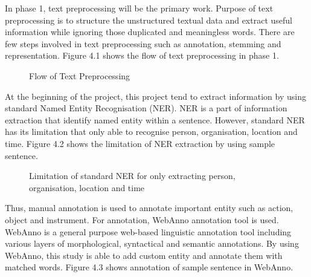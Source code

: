 \documentclass[twoside]{utmthesis}
\begin{document}
In phase 1, text preprocessing will be the primary work. Purpose of text preprocessing is to structure the unstructured textual data and extract useful information while ignoring those duplicated and meaningless words. There are few steps involved in text preprocessing such as annotation, stemming and representation. Figure 4.1 shows the flow of text preprocessing in phase 1.
\begin{figure}[H]
	\centering
	\caption{Flow of Text Preprocessing}
	\label{fig:phase1-steps}
\end{figure}
\vspace{-1cm}

At the beginning of the project, this project tend to extract information by using standard Named Entity Recognisation (NER). NER is a part of information extraction that identify named entity within a sentence.  However, standard NER has its limitation that only able to recognise person, organisation, location and time. Figure 4.2 shows the limitation of NER extraction by using sample sentence. 
\begin{figure}[H]
	\centering
	\caption{Limitation of standard NER for only extracting person, organisation, location and time}
	\label{fig:spacy4}
\end{figure}
\vspace{-1cm}

Thus, manual annotation is used to annotate important entity such as action, object and instrument. For annotation, WebAnno annotation tool is used. WebAnno is a general purpose web-based linguistic annotation tool including various layers of morphological, syntactical and semantic annotations. By using WebAnno, this study is able to add custom entity and annotate them with matched words. Figure 4.3 shows annotation of sample sentence in WebAnno. 
   
\end{document}
